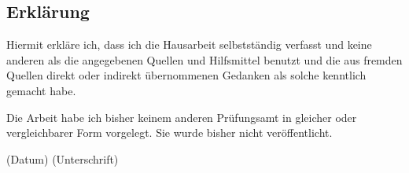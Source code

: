 \thispagestyle{empty}
\subsection*{Erklärung}
Hiermit erkläre ich, dass ich die Hausarbeit selbstständig
verfasst und keine anderen als die angegebenen Quellen und Hilfsmittel benutzt
und die aus fremden Quellen direkt oder indirekt übernommenen Gedanken als
solche kenntlich gemacht habe.

Die Arbeit habe ich bisher keinem anderen Prüfungsamt in gleicher oder
vergleichbarer Form vorgelegt. Sie wurde bisher nicht veröffentlicht.


\vspace{3cm}
\centering
(Datum) \hspace{8cm} (Unterschrift)

